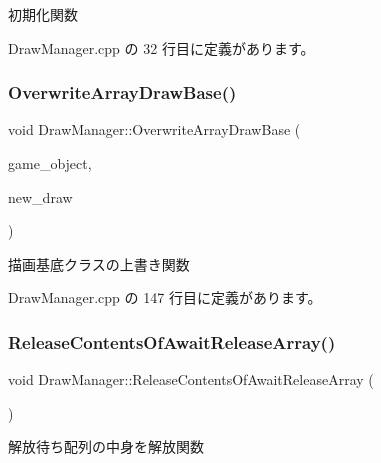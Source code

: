 初期化関数 



 Draw\+Manager.\+cpp の 32 行目に定義があります。

\mbox{\label{class_draw_manager_a94ef5a241c8d78187a2a6c0ed3c9efec}} 
\subsubsection{\texorpdfstring{Overwrite\+Array\+Draw\+Base()}{OverwriteArrayDrawBase()}}
{\footnotesize\ttfamily void Draw\+Manager\+::\+Overwrite\+Array\+Draw\+Base (\begin{DoxyParamCaption}\item[{\mbox{\hyperlink{class_game_object_base}{Game\+Object\+Base}} $\ast$}]{game\+\_\+object,  }\item[{\mbox{\hyperlink{class_draw_base}{Draw\+Base}} $\ast$}]{new\+\_\+draw }\end{DoxyParamCaption})}



描画基底クラスの上書き関数 



 Draw\+Manager.\+cpp の 147 行目に定義があります。

\mbox{\label{class_draw_manager_a76361402a035f02084e9faf31e782d69}} 
\subsubsection{\texorpdfstring{Release\+Contents\+Of\+Await\+Release\+Array()}{ReleaseContentsOfAwaitReleaseArray()}}
{\footnotesize\ttfamily void Draw\+Manager\+::\+Release\+Contents\+Of\+Await\+Release\+Array (\begin{DoxyParamCaption}{ }\end{DoxyParamCaption})\hspace{0.3cm}{\ttfamily [private]}}



解放待ち配列の中身を解放関数 



